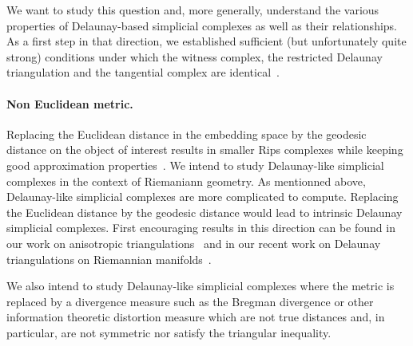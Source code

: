 We want to study this question and, more generally, understand the various properties of Delaunay-based simplicial complexes as well as their relationships. As a  first step in that direction, we established sufficient (but unfortunately quite strong) conditions under which the witness complex, the restricted Delaunay triangulation and the tangential complex are identical~\cite{boissonnat2012stab}. 

\paragraph{Non Euclidean metric.}
Replacing the Euclidean distance in the embedding space by the geodesic distance on the object of interest results in smaller Rips complexes while keeping good approximation properties~\cite{dl-clt-2009}. We intend to study Delaunay-like simplicial complexes in the context of Riemaniann geometry. 
As mentionned above, Delaunay-like simplicial complexes are more complicated to compute. Replacing the Euclidean distance by  the geodesic distance would lead to intrinsic Delaunay simplicial complexes. First encouraging results in this direction can be found in our work on anisotropic triangulations~\cite{bwy-luam-08} and in our recent work on Delaunay triangulations on Riemannian manifolds~\cite{boissonnat2012stab}. 


We also intend to study Delaunay-like simplicial complexes where the metric is replaced by a divergence measure such as the Bregman divergence or other information theoretic distortion measure which are not true distances and, in particular, are not symmetric nor satisfy the triangular inequality.


